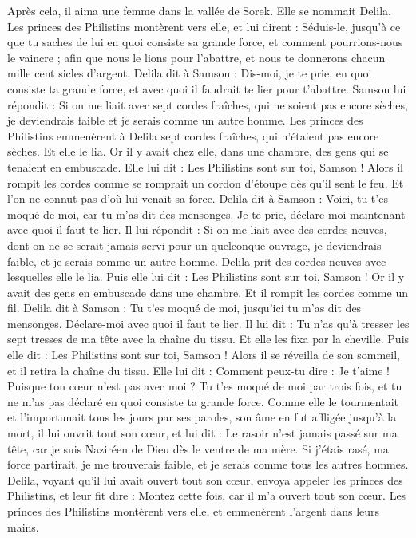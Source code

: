 \begin{multicols}{2}
Après cela, il aima une femme dans la vallée de Sorek. Elle se nommait Delila.
Les princes des Philistins montèrent vers elle, et lui dirent : Séduis-le, jusqu'à ce que tu saches de lui en quoi consiste sa grande force, et comment pourrions-nous le vaincre ; afin que nous le lions pour l'abattre, et nous te donnerons chacun mille cent sicles d'argent.
Delila dit à Samson : Dis-moi, je te prie, en quoi consiste ta grande force, et avec quoi il faudrait te lier pour t'abattre.
Samson lui répondit : Si on me liait avec sept cordes fraîches, qui ne soient pas encore sèches, je deviendrais faible et je serais comme un autre homme.
Les princes des Philistins emmenèrent à Delila sept cordes fraîches, qui n'étaient pas encore sèches. Et elle le lia.
Or il y avait chez elle, dans une chambre, des gens qui se tenaient en embuscade. Elle lui dit : Les Philistins sont sur toi, Samson ! Alors il rompit les cordes comme se romprait un cordon d'étoupe dès qu'il sent le feu. Et l'on ne connut pas d'où lui venait sa force.
Delila dit à Samson : Voici, tu t'es moqué de moi, car tu m'as dit des mensonges. Je te prie, déclare-moi maintenant avec quoi il faut te lier.
Il lui répondit : Si on me liait avec des cordes neuves, dont on ne se serait jamais servi pour un quelconque ouvrage, je deviendrais faible, et je serais comme un autre homme.
Delila prit des cordes neuves avec lesquelles elle le lia. Puis elle lui dit : Les Philistins sont sur toi, Samson ! Or il y avait des gens en embuscade dans une chambre. Et il rompit les cordes comme un fil.
Delila dit à Samson : Tu t'es moqué de moi, jusqu'ici tu m'as dit des mensonges. Déclare-moi avec quoi il faut te lier. Il lui dit : Tu n'as qu'à tresser les sept tresses de ma tête avec la chaîne du tissu.
Et elle les fixa par la cheville. Puis elle dit : Les Philistins sont sur toi, Samson ! Alors il se réveilla de son sommeil, et il retira la chaîne du tissu.
Elle lui dit : Comment peux-tu dire : Je t'aime ! Puisque ton cœur n'est pas avec moi ? Tu t'es moqué de moi par trois fois, et tu ne m'as pas déclaré en quoi consiste ta grande force.
Comme elle le tourmentait et l'importunait tous les jours par ses paroles, son âme en fut affligée jusqu'à la mort,
il lui ouvrit tout son cœur, et lui dit : Le rasoir n'est jamais passé sur ma tête, car je suis Naziréen de Dieu dès le ventre de ma mère. Si j'étais rasé, ma force partirait, je me trouverais faible, et je serais comme tous les autres hommes.
Delila, voyant qu'il lui avait ouvert tout son cœur, envoya appeler les princes des Philistins, et leur fit dire : Montez cette fois, car il m'a ouvert tout son cœur. Les princes des Philistins montèrent vers elle, et emmenèrent l'argent dans leurs mains.

\end{multicols}
